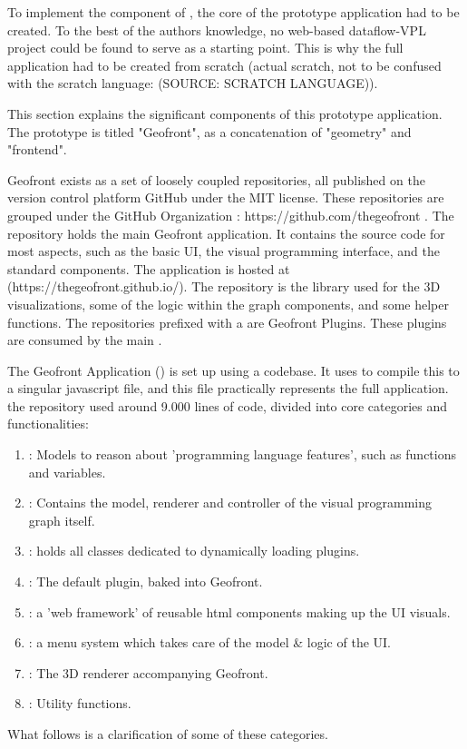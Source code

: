 \label{sec:implementation:representation}
To implement the component of \mySubRQOneTitle, the core of the prototype application had to be created.
To the best of the authors knowledge, no web-based dataflow-VPL project could be found to serve as a starting point. 
This is why the full application had to be created from scratch (actual scratch, not to be confused with the scratch language: (SOURCE: SCRATCH LANGUAGE)). 

This section explains the significant components of this prototype application. 
The prototype is titled "Geofront", as a concatenation of "geometry" and "frontend".

Geofront exists as a set of loosely coupled repositories, all published on the version control platform GitHub under the MIT license. These repositories are grouped under the GitHub Organization  : https://github.com/thegeofront .
The  repository holds the main Geofront application. It contains the source code for most aspects, such as the basic UI, the visual programming interface, and the standard components. The application is hosted at (https://thegeofront.github.io/).
The  repository is the library used for the 3D visualizations, some of the logic within the graph components, and some helper functions.
The repositories prefixed with a  are Geofront Plugins. These plugins are consumed by the main .

The Geofront Application () is set up using a  codebase. It uses  to compile this to a singular javascript file, and this file practically represents the full application. 
the repository used around 9.000 lines of code, divided into core categories and functionalities:
\begin{enumerate}[I]
  \item {}: Models to reason about 'programming language features', such as functions and variables.
  \item {}: Contains the model, renderer and controller of the visual programming graph itself.  
  \item {}: holds all classes dedicated to dynamically loading plugins.
  \item {}: The default plugin, baked into Geofront.   
  \item {}: a 'web framework' of reusable html components making up the UI visuals.
  \item {}: a menu system which takes care of the model \& logic of the UI.
  \item {}: The 3D renderer accompanying Geofront.
  \item {}: Utility functions.   
\end{enumerate}
What follows is a clarification of some of these categories.

